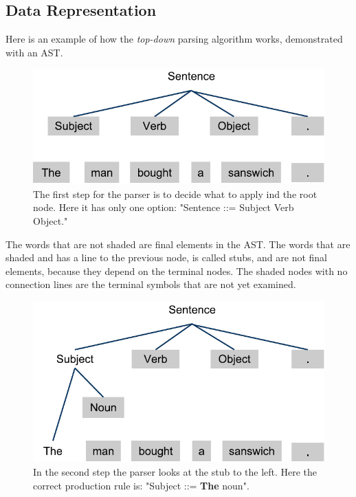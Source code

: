 \subsection{Data Representation}
\label{sec:asttheory}
Here is an example of how the \textit{top-down} parsing algorithm works, demonstrated with an AST.

\begin{figure}[H]
\begin{center}
\includegraphics[scale=0.5]{Images/parsingexample/AST1.png}
\end{center}
\caption{The first step for the parser is to decide what to apply ind the root node. Here it has only one option: "Sentence ::= Subject Verb Object."}
\end{figure}

The words that are not shaded are final elements in the AST. The words that are shaded and has a line to the previous node, is called stubs, and are not final elements, because they depend on the terminal nodes. The shaded nodes with no connection lines are the terminal symbols that are not yet examined.

\begin{figure}[H]
\begin{center}
\includegraphics[scale=0.5]{Images/parsingexample/AST2.png}
\end{center}
\caption{In the second step the parser looks at the stub to the left. Here the correct production rule is: "Subject ::= \textbf{The} noun".}
\label{fig:ast2}
\end{figure}

